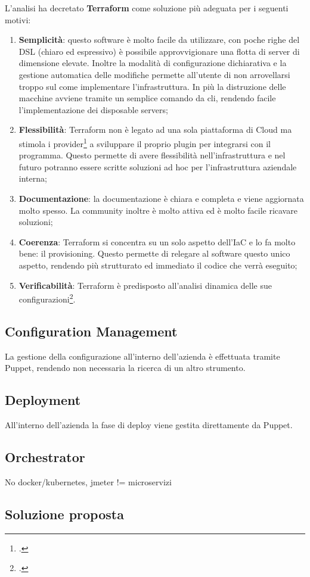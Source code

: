 L'analisi ha decretato \textbf{Terraform} come soluzione più adeguata per i seguenti motivi:
\begin{enumerate}
	\item \textbf{Semplicità}: questo software è molto facile da utilizzare, con poche righe del DSL (chiaro ed espressivo) è possibile approvvigionare una flotta di server di dimensione elevate. Inoltre la modalità di configurazione dichiarativa e la gestione automatica delle modifiche permette all'utente di non arrovellarsi troppo sul come implementare l'infrastruttura. In più la distruzione delle macchine avviene tramite un semplice comando da \gls{cli}, rendendo facile l'implementazione dei disposable servers;
	\item \textbf{Flessibilità}: Terraform non è legato ad una sola piattaforma di Cloud ma stimola i provider\footcite{article:terraformextend} a sviluppare il proprio plugin per integrarsi con il programma. Questo permette di avere flessibilità nell'infrastruttura e nel futuro potranno essere scritte soluzioni ad hoc per l'infrastruttura aziendale interna;
	\item \textbf{Documentazione}: la documentazione è chiara e completa e viene aggiornata molto spesso. La community inoltre è molto attiva ed è molto facile ricavare soluzioni;
	\item \textbf{Coerenza}: Terraform si concentra su un solo aspetto dell'IaC e lo fa molto bene: il provisioning. Questo permette di relegare al software questo unico aspetto, rendendo più strutturato ed immediato il codice che verrà eseguito;
	\item \textbf{Verificabilità}: Terraform è predisposto all'analisi dinamica delle sue configurazioni\footcite{article:terraformtest}.
\end{enumerate}
\subsection{Configuration Management}
La gestione della configurazione all'interno dell'azienda è effettuata tramite Puppet, rendendo non necessaria la ricerca di un altro strumento.  
\subsection{Deployment}
All'interno dell'azienda la fase di deploy viene gestita direttamente da Puppet.
\subsection{Orchestrator}
No docker/kubernetes, jmeter != microservizi
\subsection{Soluzione proposta}